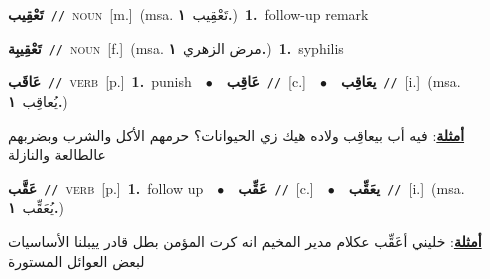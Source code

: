 \documentclass[10pt,a4paper,twoside]{article} %
\begin{document}
\begin{multicols}{2}
{\setlength\topsep{0pt}\textbf{\foreignlanguage{arabic}{تَعْقِيب}}\ {\color{gray}\texttt{//}\color{black}}\ \textsc{noun}\ [m.]\ \color{gray}(msa. \foreignlanguage{arabic}{تَعْقِيب}~\foreignlanguage{arabic}{\textbf{١.}})\color{black}\ \textbf{1.}~follow-up remark\ } \vspace{2mm}

{\setlength\topsep{0pt}\textbf{\foreignlanguage{arabic}{تَعْقِيبِة}}\ {\color{gray}\texttt{//}\color{black}}\ \textsc{noun}\ [f.]\ \color{gray}(msa. \foreignlanguage{arabic}{مرض الزهري}~\foreignlanguage{arabic}{\textbf{١.}})\color{black}\ \textbf{1.}~syphilis\ } \vspace{2mm}

{\setlength\topsep{0pt}\textbf{\foreignlanguage{arabic}{عَاقَب}}\ {\color{gray}\texttt{//}\color{black}}\ \textsc{verb}\ [p.]\ \textbf{1.}~punish\ \ $\bullet$\ \ \setlength\topsep{0pt}\textbf{\foreignlanguage{arabic}{عَاقِب}}\ {\color{gray}\texttt{//}\color{black}}\ [c.]\ \ $\bullet$\ \ \setlength\topsep{0pt}\textbf{\foreignlanguage{arabic}{يعَاقِب}}\ {\color{gray}\texttt{//}\color{black}}\ [i.]\ \color{gray}(msa. \foreignlanguage{arabic}{يُعاقِب}~\foreignlanguage{arabic}{\textbf{١.}})\color{black}\  \begin{flushright}\color{gray}\foreignlanguage{arabic}{\textbf{\underline{\foreignlanguage{arabic}{أمثلة}}}: فيه أب بيعاقِب ولاده هيك زي الحيوانات؟ حرمهم الأكل والشرب وبضربهم عالطالعة والنازلة}\end{flushright}\color{black}} \vspace{2mm}

{\setlength\topsep{0pt}\textbf{\foreignlanguage{arabic}{عَقَّب}}\ {\color{gray}\texttt{//}\color{black}}\ \textsc{verb}\ [p.]\ \textbf{1.}~follow up\ \ $\bullet$\ \ \setlength\topsep{0pt}\textbf{\foreignlanguage{arabic}{عَقِّب}}\ {\color{gray}\texttt{//}\color{black}}\ [c.]\ \ $\bullet$\ \ \setlength\topsep{0pt}\textbf{\foreignlanguage{arabic}{يعَقِّب}}\ {\color{gray}\texttt{//}\color{black}}\ [i.]\ \color{gray}(msa. \foreignlanguage{arabic}{يُعَقِّب}~\foreignlanguage{arabic}{\textbf{١.}})\color{black}\  \begin{flushright}\color{gray}\foreignlanguage{arabic}{\textbf{\underline{\foreignlanguage{arabic}{أمثلة}}}: خليني أعَقِّب عكلام مدير المخيم انه كرت المؤمن بطل قادر ييبلنا الأساسيات لبعض العوائل المستورة}\end{flushright}\color{black}} \vspace{2mm}


\end{multicols}
\end{document}
